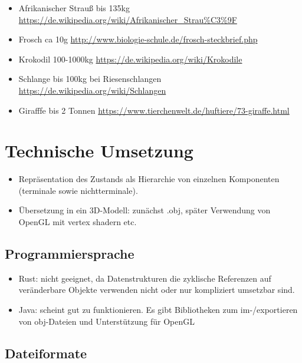 \begin{itemize}
  \item Afrikanischer Strauß bis 135kg \url{https://de.wikipedia.org/wiki/Afrikanischer_Strau\%C3\%9F}
  \item Frosch ca 10g \url{http://www.biologie-schule.de/frosch-steckbrief.php}
  \item Krokodil 100-1000kg \url{https://de.wikipedia.org/wiki/Krokodile}
  \item Schlange bis 100kg bei Riesenschlangen \url{https://de.wikipedia.org/wiki/Schlangen}
  \item Girafffe bis 2 Tonnen \url{https://www.tierchenwelt.de/huftiere/73-giraffe.html}
 \end{itemize}

 
 
\chapter{Technische Umsetzung}

\begin{itemize}
 \item Repräsentation des Zustands als Hierarchie von einzelnen Komponenten (terminale sowie nichtterminale).
 \item Übersetzung in ein 3D-Modell: zunächst .obj, später Verwendung von OpenGL mit vertex shadern etc.\
\end{itemize}


\section{Programmiersprache}

\begin{itemize}
 \item Rust: nicht geeignet, da Datenstrukturen die zyklische Referenzen auf veränderbare Objekte verwenden nicht oder nur kompliziert umsetzbar sind.
 \item Java: scheint gut zu funktionieren. Es gibt Bibliotheken zum im-/exportieren von obj-Dateien und Unterstützung für OpenGL
\end{itemize}


\section{Dateiformate}

